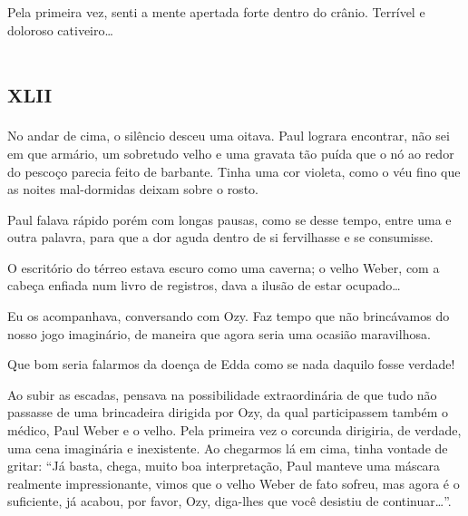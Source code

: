 Pela primeira vez, senti a mente apertada forte dentro do crânio. Terrível e doloroso cativeiro\ldots{}


\chapter*{\huge\centering\textsc{xlii}}


No andar de cima, o silêncio desceu uma oitava. Paul lograra encontrar, não sei em que armário, um sobretudo velho e uma gravata tão puída que o nó ao redor do pescoço parecia feito de barbante. Tinha uma cor violeta, como o véu fino que as noites mal-dormidas deixam sobre o rosto.


Paul falava rápido porém com longas pausas, como se desse tempo, entre uma e outra palavra, para que a dor aguda dentro de si fervilhasse e se consumisse.

O escritório do térreo estava escuro como uma caverna; o velho Weber, com a cabeça enfiada num livro de registros, dava a ilusão de estar ocupado\ldots{}


Eu os acompanhava, conversando com Ozy. Faz tempo que não brincávamos do nosso jogo imaginário, de maneira que agora seria uma ocasião maravilhosa.

Que bom seria falarmos da doença de Edda como se nada daquilo fosse verdade!

Ao subir as escadas, pensava na possibilidade extraordinária de que tudo não passasse de uma brincadeira dirigida por Ozy, da qual participassem também o médico, Paul Weber e o velho. Pela primeira vez o corcunda dirigiria, de verdade, uma cena imaginária e inexistente. Ao chegarmos lá em cima, tinha vontade de gritar: ``Já basta, chega, muito boa interpretação, Paul manteve uma máscara realmente impressionante, vimos que o velho Weber de fato sofreu, mas agora é o suficiente, já acabou, por favor, Ozy, diga-lhes que você desistiu de continuar\ldots{}''.

